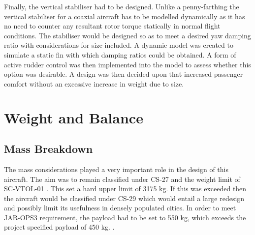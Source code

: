\documentclass[11pt,a4paper]{article}
\begin{document}
Finally, the vertical stabiliser had to be designed. Unlike a penny-farthing the vertical stabiliser for a coaxial aircraft has to be modelled dynamically as it has no need to counter any resultant rotor torque statically in normal flight conditions. The stabiliser would be designed so as to meet a desired yaw damping ratio with considerations for size included. A dynamic model was created to simulate a static fin with which damping ratios could be obtained. A form of active rudder control was then implemented into the model to assess whether this option was desirable. A design was then decided upon that increased passenger comfort without an excessive increase in weight due to size.

\section{Weight and Balance}
\subsection{Mass Breakdown}
The mass considerations played a very important role in the design of this aircraft. The aim was to remain classified under CS-27 \cite{cs27} and the weight limit of SC-VTOL-01 \cite{scvtol}. This set a hard upper limit of 3175 kg. If this was exceeded then the aircraft would be classified under CS-29 which would entail a large redesign and possibly limit its usefulness in densely populated cities. In order to meet JAR-OPS3 requirement, the payload had to be set to 550 kg, which exceeds the project specified payload of 450 kg. \cite{jarops3}.
\end{document}
